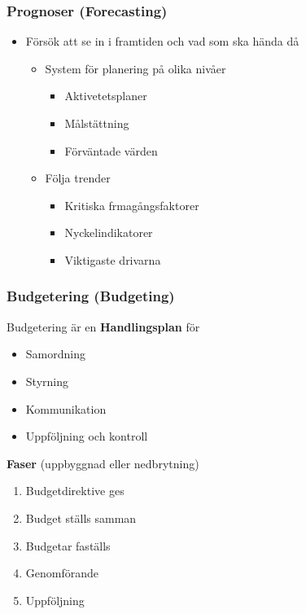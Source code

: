 \documentclass{article}
\begin{document}
\subsubsection{Prognoser (Forecasting)}
\begin{itemize}
    \item Försök att se in i framtiden och vad som ska hända då 
    \begin{itemize}
        \item System för planering på olika nivåer
        \begin{itemize}
            \item Aktivetetsplaner
            \item Målstättning
            \item Förväntade värden
        \end{itemize}
        \item Följa trender
        \begin{itemize}
            \item Kritiska frmagångsfaktorer
            \item Nyckelindikatorer
            \item Viktigaste drivarna
        \end{itemize}
    \end{itemize}
\end{itemize}

\subsubsection{Budgetering (Budgeting)}
Budgetering är en \textbf{Handlingsplan} för 
\begin{itemize}
    \item Samordning
    \item Styrning
    \item Kommunikation
    \item Uppföljning och kontroll
\end{itemize}

\textbf{Faser} (uppbyggnad eller nedbrytning)
\begin{enumerate}
    \item Budgetdirektive ges
    \item Budget ställs samman 
    \item Budgetar faställs
    \item Genomförande
    \item Uppföljning
\end{enumerate}
\end{document}
